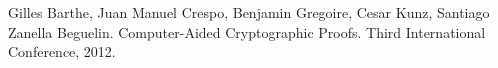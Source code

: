 \documentclass[runningheads]{llncs}
\begin{document}
%
%
%
%
% 
% 
%
\begin{thebibliography}{8}
Gilles Barthe, Juan Manuel Crespo, Benjamin Gregoire, Cesar Kunz, Santiago Zanella Beguelin. Computer-Aided Cryptographic Proofs. Third International Conference, 2012.
\end{thebibliography}
\end{document}
